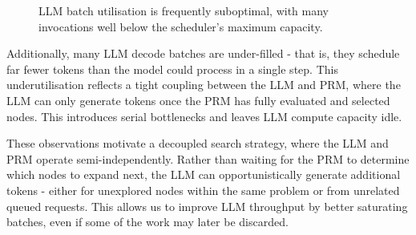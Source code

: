 \documentclass[12pt,twoside]{report}
\begin{document}
\begin{figure}[htbp]
\centering
{}
\vspace{1em}
\caption{LLM batch utilisation is frequently suboptimal, with many invocations well below the scheduler’s maximum capacity.}
\label{fig:batch-utilisation-comparison}
\end{figure}

Additionally, many LLM decode batches are under-filled - that is, they schedule far fewer tokens than the model could process in a single step. 
This underutilisation reflects a tight coupling between the LLM and PRM, where the LLM can only generate tokens once the PRM has fully evaluated and selected nodes. 
This introduces serial bottlenecks and leaves LLM compute capacity idle.

These observations motivate a decoupled search strategy, where the LLM and PRM operate semi-independently. 
Rather than waiting for the PRM to determine which nodes to expand next, the LLM can opportunistically generate additional tokens - either for unexplored nodes within the same problem or from unrelated queued requests. 
This allows us to improve LLM throughput by better saturating batches, even if some of the work may later be discarded.
\end{document}
